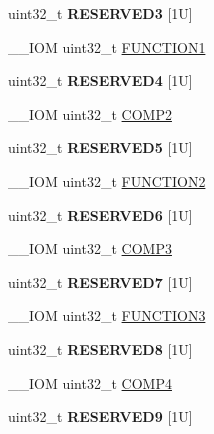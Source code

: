 \begin{DoxyCompactItemize}
uint32\+\_\+t {\bfseries R\+E\+S\+E\+R\+V\+E\+D3} \mbox{[}1\+U\mbox{]}
\item 
\+\_\+\+\_\+\+I\+OM uint32\+\_\+t \hyperlink{struct_d_w_t___type_a8dfcf25675f9606aa305c46e85182e4e}{F\+U\+N\+C\+T\+I\+O\+N1}
\item 
\mbox{\label{struct_d_w_t___type_abaa69c512745a42285bcc92a1e99b565}} 
uint32\+\_\+t {\bfseries R\+E\+S\+E\+R\+V\+E\+D4} \mbox{[}1\+U\mbox{]}
\item 
\+\_\+\+\_\+\+I\+OM uint32\+\_\+t \hyperlink{struct_d_w_t___type_a5ae6dde39989f27bae90afc2347deb46}{C\+O\+M\+P2}
\item 
\mbox{\label{struct_d_w_t___type_a1e54059fc51e21b36885d31e72b68cd5}} 
uint32\+\_\+t {\bfseries R\+E\+S\+E\+R\+V\+E\+D5} \mbox{[}1\+U\mbox{]}
\item 
\+\_\+\+\_\+\+I\+OM uint32\+\_\+t \hyperlink{struct_d_w_t___type_ab1b60d6600c38abae515bab8e86a188f}{F\+U\+N\+C\+T\+I\+O\+N2}
\item 
\mbox{\label{struct_d_w_t___type_a62a31fc56c843f2b0e882581a4bd95d2}} 
uint32\+\_\+t {\bfseries R\+E\+S\+E\+R\+V\+E\+D6} \mbox{[}1\+U\mbox{]}
\item 
\+\_\+\+\_\+\+I\+OM uint32\+\_\+t \hyperlink{struct_d_w_t___type_a85eb73d1848ac3f82d39d6c3e8910847}{C\+O\+M\+P3}
\item 
\mbox{\label{struct_d_w_t___type_a55303904d9b89ffe6c28c698d997ed10}} 
uint32\+\_\+t {\bfseries R\+E\+S\+E\+R\+V\+E\+D7} \mbox{[}1\+U\mbox{]}
\item 
\+\_\+\+\_\+\+I\+OM uint32\+\_\+t \hyperlink{struct_d_w_t___type_a52d4ff278fae6f9216c63b74ce328841}{F\+U\+N\+C\+T\+I\+O\+N3}
\item 
\mbox{\label{struct_d_w_t___type_a4225e4489493a263ecfb7b00644c04a6}} 
uint32\+\_\+t {\bfseries R\+E\+S\+E\+R\+V\+E\+D8} \mbox{[}1\+U\mbox{]}
\item 
\+\_\+\+\_\+\+I\+OM uint32\+\_\+t \hyperlink{struct_d_w_t___type_a86bc7f4ad425a05b29978a6f97563783}{C\+O\+M\+P4}
\item 
\mbox{\label{struct_d_w_t___type_a8d4678b07579ce92ecb788d4c4dfef81}} 
uint32\+\_\+t {\bfseries R\+E\+S\+E\+R\+V\+E\+D9} \mbox{[}1\+U\mbox{]}
\item 

\end{DoxyCompactItemize}

